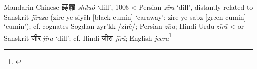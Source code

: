 \begin{etymology}\label{ety:shiluo}
Mandarin Chinese {蒔蘿} \textit{shíluó} `dill', 1008
< Persian \textit{zīra} `dill', distantly related to Sanskrit \textit{jīraka} (zire-ye siyāh [black cumin] `caraway'; zire-ye sabz [green cumin] `cumin'); cf. cognates Sogdian zyr'kk /zîrê/; Persian \textit{zīra}; Hindi-Urdu \textit{zīrā}
< or Sanskrit {जीर} \textit{jīra} `dill'; cf. Hindi जीरा \textit{jīrā}; English \textit{jeera}\footnote{\textcite[634]{steingass_comprehensive_1892}}
\end{etymology}